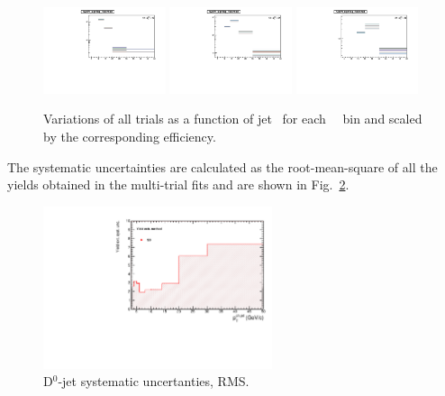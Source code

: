 \begin{figure}[bth]
\begin{center}
\includegraphics[width=0.32\textwidth]{pPbcuts_2sig/multi_trial/JetPtTrialsDPt6_log.pdf}
\includegraphics[width=0.32\textwidth]{pPbcuts_2sig/multi_trial/JetPtTrialsDPt7_log.pdf}
\includegraphics[width=0.32\textwidth]{pPbcuts_2sig/multi_trial/JetPtTrialsDPt8_log.pdf}
\caption{Variations of all trials as a function of jet \pt\ for each \Dzero\ \pt\ bin and scaled by the corresponding efficiency.} 
\label{fig:MultiTrialSB_allDptVairations_pPB_Dzero}
\end{center}
\end{figure}

The systematic uncertainties are calculated as the root-mean-square of all the yields obtained in the multi-trial fits and are shown in Fig.~\ref{fig:MultiTrialRMS_pPB_Dzero}.
\begin{figure}[bth]
\begin{center}
\includegraphics[width=0.6\textwidth]{pPbcuts_2sig/multi_trial/YieldExtSysUnc.pdf} 
\caption{D$^0$-jet systematic uncertanties, RMS.}
\label{fig:MultiTrialRMS_pPB_Dzero}
\end{center}
\end{figure}


